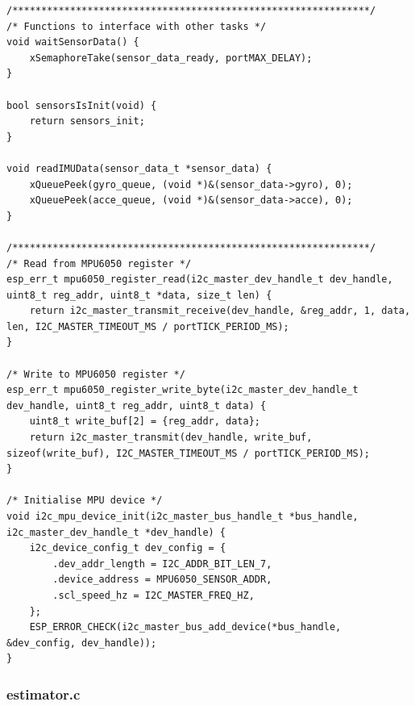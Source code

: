 \begin{lstlisting}
/**************************************************************/
/* Functions to interface with other tasks */
void waitSensorData() { 
    xSemaphoreTake(sensor_data_ready, portMAX_DELAY);
}

bool sensorsIsInit(void) {
    return sensors_init;
}

void readIMUData(sensor_data_t *sensor_data) {
    xQueuePeek(gyro_queue, (void *)&(sensor_data->gyro), 0);
    xQueuePeek(acce_queue, (void *)&(sensor_data->acce), 0);
}

/**************************************************************/
/* Read from MPU6050 register */
esp_err_t mpu6050_register_read(i2c_master_dev_handle_t dev_handle, uint8_t reg_addr, uint8_t *data, size_t len) {
    return i2c_master_transmit_receive(dev_handle, &reg_addr, 1, data, len, I2C_MASTER_TIMEOUT_MS / portTICK_PERIOD_MS);
}

/* Write to MPU6050 register */
esp_err_t mpu6050_register_write_byte(i2c_master_dev_handle_t dev_handle, uint8_t reg_addr, uint8_t data) {
    uint8_t write_buf[2] = {reg_addr, data};
    return i2c_master_transmit(dev_handle, write_buf, sizeof(write_buf), I2C_MASTER_TIMEOUT_MS / portTICK_PERIOD_MS);
}

/* Initialise MPU device */
void i2c_mpu_device_init(i2c_master_bus_handle_t *bus_handle, i2c_master_dev_handle_t *dev_handle) {
    i2c_device_config_t dev_config = {
        .dev_addr_length = I2C_ADDR_BIT_LEN_7,
        .device_address = MPU6050_SENSOR_ADDR,
        .scl_speed_hz = I2C_MASTER_FREQ_HZ,
    };
    ESP_ERROR_CHECK(i2c_master_bus_add_device(*bus_handle, &dev_config, dev_handle));
}
\end{lstlisting}

\pagebreak
\subsubsection{estimator.c}

